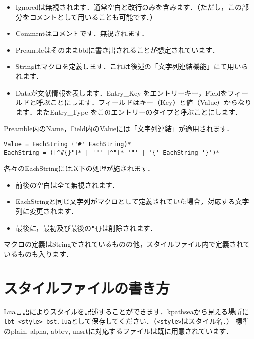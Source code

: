 \documentclass[dvipdfmx,a4paper]{jsarticle}
\begin{document}
\begin{itemize}
\item Ignoredは無視されます．通常空白と改行のみを含みます．（ただし，この部分をコメントとして用いることも可能です．）
\item Commentはコメントです．無視されます．
\item Preambleはそのままbblに書き出されることが想定されています．
\item Stringはマクロを定義します．これは後述の「文字列連結機能」にて用いられます．
\item Dataが文献情報を表します．Entry\_Key をエントリーキー，Fieldをフィールドと呼ぶことにします．フィールドはキー（Key）と値（Value）からなります．またEntry\_Type をこのエントリーのタイプと呼ぶことにします．
\end{itemize}

Preamble内のName，Field内のValueには「文字列連結」が適用されます．
\begin{verbatim}
Value = EachString ('#' EachString)*
EachString = ([^#{}"]* | '"' [^"]* '"' | '{' EachString '}')*
\end{verbatim}
各々のEachStringには以下の処理が施されます．
\begin{itemize}
\item 前後の空白は全て無視されます．
\item EachStringと同じ文字列がマクロとして定義されていた場合，対応する文字列に変更されます．
\item 最後に，最初及び最後の\verb|"{}|は削除されます．
\end{itemize}
マクロの定義はStringでされているものの他，スタイルファイル内で定義されているものも入ります．


\section{スタイルファイルの書き方}
Lua言語によりスタイルを記述することができます．kpathseaから見える場所に\verb|lbt-<style>_bst.lua|として保存してください．（\verb|<style>|はスタイル名．）
標準のplain, alpha, abbrv, unsrtに対応するファイルは既に用意されています．
\end{document}

